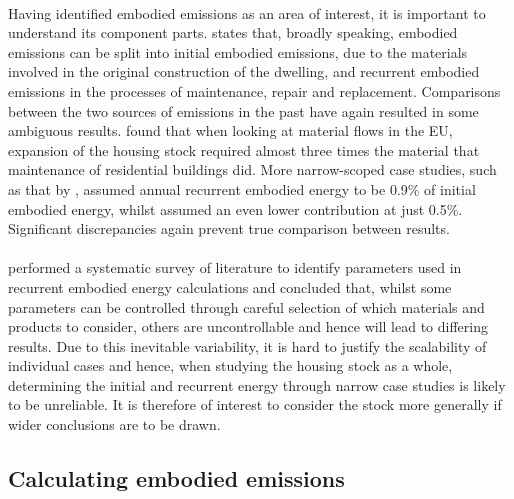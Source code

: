 \documentclass[12pt]{article}
\begin{document}
\paragraph{}
Having identified embodied emissions as an area of interest, it is important to understand its component parts. \citet{Dixit2019-bj} states that, broadly speaking, embodied emissions can be split into initial embodied emissions, due to the materials involved in the original construction of the dwelling, and recurrent embodied emissions in the processes of maintenance, repair and replacement. Comparisons between the two sources of emissions in the past have again resulted in some ambiguous results. \citet{Wiedenhofer2015-wn} found that when looking at material flows in the EU, expansion of the housing stock required almost three times the material that maintenance of residential buildings did. More narrow-scoped case studies, such as that by \citet{Barnes1975-jh}, assumed annual recurrent embodied energy to be 0.9\% of initial embodied energy, whilst \citet{Stephan2011-sd} assumed an even lower contribution at just 0.5\%. Significant discrepancies again prevent true comparison between results. 

\paragraph{}
\citet{Dixit2019-bj} performed a systematic survey of literature to identify parameters used in recurrent embodied energy calculations and concluded that, whilst some parameters can be controlled through careful selection of which materials and products to consider, others are uncontrollable and hence will lead to differing results. Due to this inevitable variability, it is hard to justify the scalability of individual cases and hence, when studying the housing stock as a whole, determining the initial and recurrent energy through narrow case studies is likely to be unreliable. It is therefore of interest to consider the stock more generally if wider conclusions are to be drawn.

\subsection{Calculating embodied emissions}
\label{CalculatingEmissions}
\end{document}
